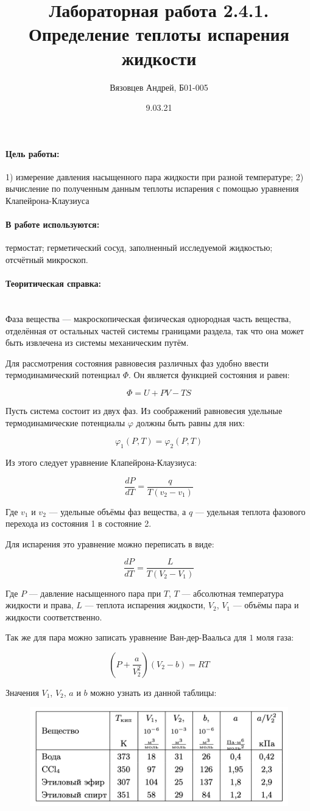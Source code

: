 \documentclass[a4paper, 12pt]{article}
\author{Вязовцев Андрей, Б01-005}
\date{9.03.21}
\title{Лабораторная работа 2.4.1. Определение теплоты испарения жидкости}
\renewcommand{\phi}{\varphi}
\newcommand{\parag}[1]{\paragraph*{#1:}}
\begin{document}
\maketitle

\parag {Цель работы}
1) измерение давления насыщенного пара жидкости при разной температуре; 2) вычисление по полученным данным теплоты испарения с помощью уравнения Клапейрона-Клаузиуса

\parag {В работе используются}
термостат; герметический сосуд, заполненный исследуемой жидкостью; отсчётный микроскоп.

\parag {Теоритическая справка} ~\\

Фаза вещества --- макроскопическая физическая однородная часть вещества, отделённая от остальных частей системы границами раздела, так что она может быть извлечена из системы механическим путём.

Для рассмотрения состояния равновесия различных фаз удобно ввести термодинамический потенциал $\Phi$. Он является функцией состояния и равен:

\[
    \Phi = U + PV - TS
\]

Пусть система состоит из двух фаз. Из соображений равновесия удельные термодинамические потенциалы $\phi$ должны быть равны для них:

\[
    \phi_1 (P, T) = \phi_2 (P, T)
\]

Из этого следует уравнение Клапейрона-Клаузиуса:

\[
    \frac{dP}{dT} =   \frac{q}{T(v_2 - v_1)}
\]

Где $v_1$ и $v_2$ --- удельные объёмы фаз вещества, а $q$ --- удельная теплота фазового перехода из состояния 1 в состояние 2.

Для испарения это уравнение можно переписать в виде:

\[
    \frac{dP}{dT} = \frac{L}{T (V_2 - V_1)}
\]

Где $P$ --- давление насыщенного пара при $T$, $T$ --- абсолютная температура жидкости и права, $L$ --- теплота испарения жидкости, $V_2$, $V_1$ --- объёмы пара и жидкости соответственно.

Так же для пара можно записать уравнение Ван-дер-Ваальса для $1$ моля газа:

\[
    \left(P + \frac{a}{V_2^2}\right) (V_2 - b) = RT
\]

Значения $V_1$, $V_2$, $a$ и $b$ можно узнать из данной таблицы:

\begin{figure}[!h]
    \includegraphics[scale = 0.7]{Constants}
\end{figure}
\end{document}
